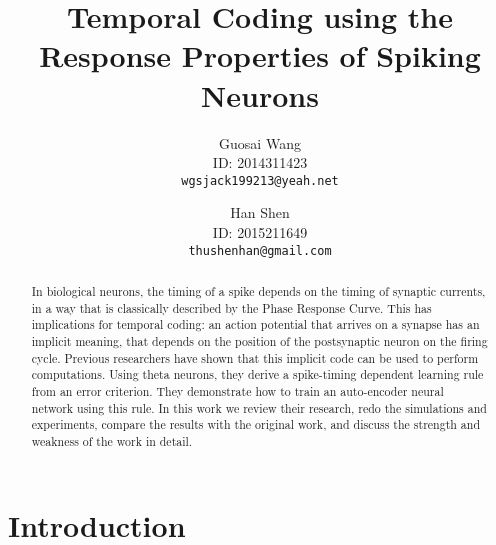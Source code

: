 \documentclass[10pt,twocolumn,letterpaper]{article}
\begin{document}
\title{Temporal Coding using the Response Properties of Spiking Neurons}

\author{
Guosai Wang\\
ID: 2014311423\\
{\tt\small wgsjack199213@yeah.net}
\and
Han Shen\\
ID: 2015211649\\
{\tt\small thushenhan@gmail.com}
}


\maketitle

\begin{abstract}
In biological neurons, the timing of a spike depends on the timing of synaptic currents,
in a way that is classically described by the Phase Response Curve. 
This has implications for temporal coding: an action potential that arrives on a synapse has an implicit meaning, 
that depends on the position of the postsynaptic neuron on the firing cycle. 
Previous researchers have shown that this implicit code can be used to perform computations. 
Using theta neurons, they derive a spike-timing dependent learning rule from an error criterion. 
They demonstrate how to train an auto-encoder neural network using this rule.
In this work we review their research, redo the simulations and experiments, compare the results with the
original work, and discuss the strength and weakness of the work in detail.
\end{abstract}

\section{Introduction}














{\small


}
\end{document}
